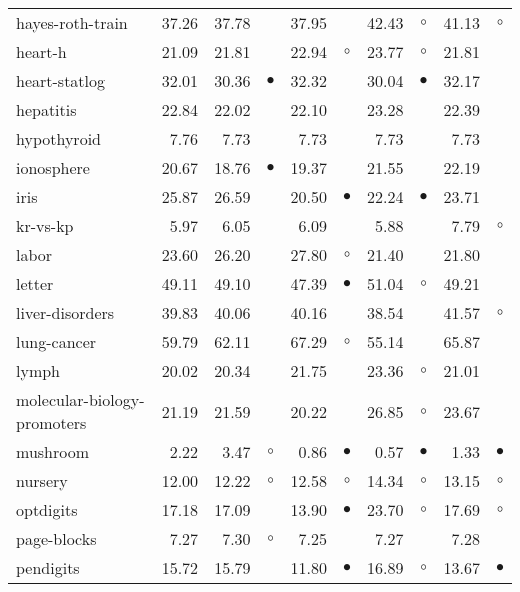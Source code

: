 \begin{table}[thb]
{\begin{tabular}{lrr@{\hspace{0.1cm}}cr@{\hspace{0.1cm}}cr@{\hspace{0.1cm}}cr@{\hspace{0.1cm}}c}
hayes-roth-train & 37.26 & 37.78 &           & 37.95 &           & 42.43 &   $\circ$ & 41.13 &   $\circ$\\
heart-h & 21.09 & 21.81 &           & 22.94 &   $\circ$ & 23.77 &   $\circ$ & 21.81 &          \\
heart-statlog & 32.01 & 30.36 & $\bullet$ & 32.32 &           & 30.04 & $\bullet$ & 32.17 &          \\
hepatitis & 22.84 & 22.02 &           & 22.10 &           & 23.28 &           & 22.39 &          \\
hypothyroid &  7.76 &  7.73 &           &  7.73 &           &  7.73 &           &  7.73 &          \\
ionosphere & 20.67 & 18.76 & $\bullet$ & 19.37 &           & 21.55 &           & 22.19 &          \\
iris & 25.87 & 26.59 &           & 20.50 & $\bullet$ & 22.24 & $\bullet$ & 23.71 &          \\
kr-vs-kp &  5.97 &  6.05 &           &  6.09 &           &  5.88 &           &  7.79 &   $\circ$\\
labor & 23.60 & 26.20 &           & 27.80 &   $\circ$ & 21.40 &           & 21.80 &          \\
letter & 49.11 & 49.10 &           & 47.39 & $\bullet$ & 51.04 &   $\circ$ & 49.21 &          \\
liver-disorders & 39.83 & 40.06 &           & 40.16 &           & 38.54 &           & 41.57 &   $\circ$\\
lung-cancer & 59.79 & 62.11 &           & 67.29 &   $\circ$ & 55.14 &           & 65.87 &          \\
lymph & 20.02 & 20.34 &           & 21.75 &           & 23.36 &   $\circ$ & 21.01 &          \\
molecular-biology-promoters & 21.19 & 21.59 &           & 20.22 &           & 26.85 &   $\circ$ & 23.67 &          \\
mushroom &  2.22 &  3.47 &   $\circ$ &  0.86 & $\bullet$ &  0.57 & $\bullet$ &  1.33 & $\bullet$\\
nursery & 12.00 & 12.22 &   $\circ$ & 12.58 &   $\circ$ & 14.34 &   $\circ$ & 13.15 &   $\circ$\\
optdigits & 17.18 & 17.09 &           & 13.90 & $\bullet$ & 23.70 &   $\circ$ & 17.69 &   $\circ$\\
page-blocks &  7.27 &  7.30 &   $\circ$ &  7.25 &           &  7.27 &           &  7.28 &          \\
pendigits & 15.72 & 15.79 &           & 11.80 & $\bullet$ & 16.89 &   $\circ$ & 13.67 & $\bullet$\\

\end{tabular}}
\end{table}
